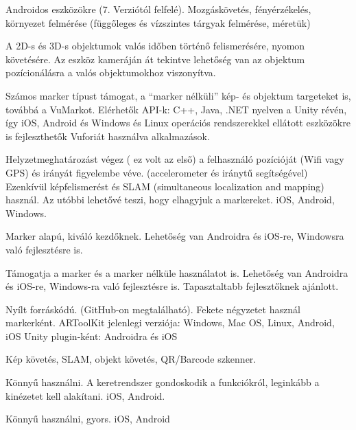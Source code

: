 
Androidos eszközökre (7. Verziótól felfelé).
Mozgáskövetés, fényérzékelés, környezet felmérése (függőleges és vízszintes tárgyak felmérése, méretük)


A 2D-s és 3D-s objektumok valós időben történő felismerésére, nyomon követésére. Az eszköz kameráján át tekintve lehetőség van az objektum pozícionálásra a valós objektumokhoz viszonyítva.

Számos marker típust támogat, a “marker nélküli” kép- és objektum targeteket is, továbbá a VuMarkot.
Elérhetők API-k: C++, Java, .NET nyelven a Unity révén, így iOS, Android és Windows és Linux operációs rendszerekkel ellátott eszközökre is fejleszthetők Vuforiát használva alkalmazások.


Helyzetmeghatározást végez ( ez volt az első) a felhasználó pozícióját (Wifi vagy GPS) és irányát figyelembe véve. (accelerometer és iránytű segítségével)
Ezenkívül képfelismerést és SLAM (simultaneous localization and mapping) használ. Az utóbbi lehetővé teszi, hogy elhagyjuk a markereket.
iOS, Android, Windows.


Marker alapú, kiváló kezdőknek. Lehetőség van Androidra és iOS-re, Windowsra való fejlesztésre is.


Támogatja a marker és a marker nélküle használatot is. 
Lehetőség van Androidra és iOS-re, Windows-ra való fejlesztésre is.
Tapasztaltabb fejlesztőknek ajánlott. 


Nyílt forráskódú. (GitHub-on megtalálható).
Fekete négyzetet használ markerként.
ARToolKit jelenlegi verziója: Windows, Mac OS,  Linux, Android, iOS
Unity plugin-ként: Androidra és iOS


Kép követés, SLAM, objekt követés, QR/Barcode szkenner.


Könnyű használni. A keretrendszer gondoskodik a funkciókról, leginkább a kinézetet kell alakítani.
iOS, Android.


Könnyű használni, gyors.
iOS, Android


